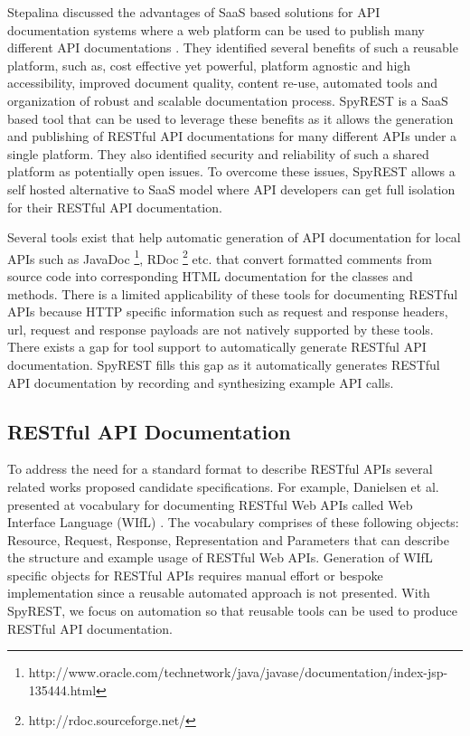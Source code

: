 \documentclass[conference]{IEEEtran}
\begin{document}
Stepalina discussed the advantages of SaaS based solutions for API documentation systems where a web platform can be used to publish many different API documentations \cite{Stepalina_saas}. They identified several benefits of such a reusable platform, such as, cost effective yet powerful, platform agnostic and high accessibility, improved document quality, content re-use, automated tools and organization of robust and scalable documentation process. SpyREST is a SaaS based tool that can be used to leverage these benefits as it allows the generation and publishing of RESTful API documentations for many different APIs under a single platform. They also identified security and reliability of such a shared platform as potentially open issues. To overcome these issues, SpyREST allows a self hosted alternative to SaaS model where API developers can get full isolation for their RESTful API documentation.

Several tools exist that help automatic generation of API documentation for local APIs such as JavaDoc \footnote{http://www.oracle.com/technetwork/java/javase/documentation/index-jsp-135444.html}, RDoc \footnote{http://rdoc.sourceforge.net/} etc. that convert formatted comments from source code into corresponding HTML documentation for the classes and methods. There is a limited applicability of these tools for documenting RESTful APIs because HTTP specific information such as request and response headers, url, request and response payloads are not natively supported by these tools. There exists a gap for tool support to automatically generate RESTful API documentation. SpyREST fills this gap as it automatically generates RESTful API documentation by recording and synthesizing example API calls.

\subsection{RESTful API Documentation} %
\label{sub:restful_api_documentation}

To address the need for a standard format to describe RESTful APIs several related works proposed candidate specifications. For example, Danielsen et al. presented at vocabulary for documenting RESTful Web APIs called Web Interface Language (WIfL) \cite{Danielsen_validation}. The vocabulary comprises of these following objects: Resource, Request, Response, Representation and Parameters that can describe the structure and example usage of RESTful Web APIs. Generation of WIfL specific objects for RESTful APIs requires manual effort or bespoke implementation since a reusable automated approach is not presented. With SpyREST, we focus on automation so that reusable tools can be used to produce RESTful API documentation.
\end{document}
